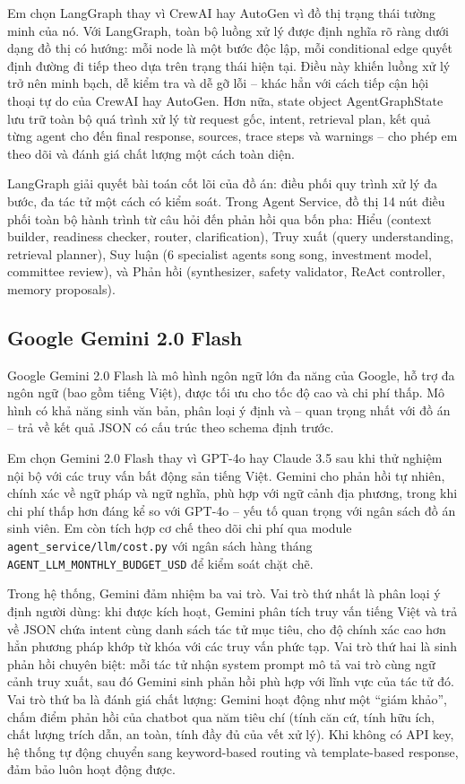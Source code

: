 Em chọn LangGraph thay vì CrewAI hay AutoGen vì đồ thị trạng thái tường minh của nó. Với LangGraph, toàn bộ luồng xử lý được định nghĩa rõ ràng dưới dạng đồ thị có hướng: mỗi node là một bước độc lập, mỗi conditional edge quyết định đường đi tiếp theo dựa trên trạng thái hiện tại. Điều này khiến luồng xử lý trở nên minh bạch, dễ kiểm tra và dễ gỡ lỗi -- khác hẳn với cách tiếp cận hội thoại tự do của CrewAI hay AutoGen. Hơn nữa, state object AgentGraphState lưu trữ toàn bộ quá trình xử lý từ request gốc, intent, retrieval plan, kết quả từng agent cho đến final response, sources, trace steps và warnings -- cho phép em theo dõi và đánh giá chất lượng một cách toàn diện.

LangGraph giải quyết bài toán cốt lõi của đồ án: điều phối quy trình xử lý đa bước, đa tác tử một cách có kiểm soát. Trong Agent Service, đồ thị 14 nút điều phối toàn bộ hành trình từ câu hỏi đến phản hồi qua bốn pha: Hiểu (context builder, readiness checker, router, clarification), Truy xuất (query understanding, retrieval planner), Suy luận (6 specialist agents song song, investment model, committee review), và Phản hồi (synthesizer, safety validator, ReAct controller, memory proposals).

\subsection{Google Gemini 2.0 Flash}

Google Gemini 2.0 Flash là mô hình ngôn ngữ lớn đa năng của Google, hỗ trợ đa ngôn ngữ (bao gồm tiếng Việt), được tối ưu cho tốc độ cao và chi phí thấp. Mô hình có khả năng sinh văn bản, phân loại ý định và -- quan trọng nhất với đồ án -- trả về kết quả JSON có cấu trúc theo schema định trước.

Em chọn Gemini 2.0 Flash thay vì GPT-4o hay Claude 3.5 sau khi thử nghiệm nội bộ với các truy vấn bất động sản tiếng Việt. Gemini cho phản hồi tự nhiên, chính xác về ngữ pháp và ngữ nghĩa, phù hợp với ngữ cảnh địa phương, trong khi chi phí thấp hơn đáng kể so với GPT-4o -- yếu tố quan trọng với ngân sách đồ án sinh viên. Em còn tích hợp cơ chế theo dõi chi phí qua module \texttt{agent\_service/llm/cost.py} với ngân sách hàng tháng \texttt{AGENT\_LLM\_MONTHLY\_BUDGET\_USD} để kiểm soát chặt chẽ.

Trong hệ thống, Gemini đảm nhiệm ba vai trò. Vai trò thứ nhất là phân loại ý định người dùng: khi được kích hoạt, Gemini phân tích truy vấn tiếng Việt và trả về JSON chứa intent cùng danh sách tác tử mục tiêu, cho độ chính xác cao hơn hẳn phương pháp khớp từ khóa với các truy vấn phức tạp. Vai trò thứ hai là sinh phản hồi chuyên biệt: mỗi tác tử nhận system prompt mô tả vai trò cùng ngữ cảnh truy xuất, sau đó Gemini sinh phản hồi phù hợp với lĩnh vực của tác tử đó. Vai trò thứ ba là đánh giá chất lượng: Gemini hoạt động như một ``giám khảo'', chấm điểm phản hồi của chatbot qua năm tiêu chí (tính căn cứ, tính hữu ích, chất lượng trích dẫn, an toàn, tính đầy đủ của vết xử lý). Khi không có API key, hệ thống tự động chuyển sang keyword-based routing và template-based response, đảm bảo luôn hoạt động được.

